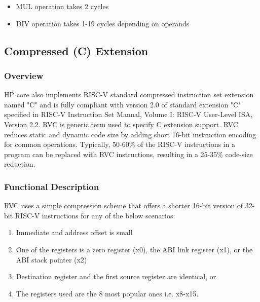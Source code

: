\documentclass[main\_\_EN.tex]{subfiles}
\begin{document}
\begin{itemize}
    \item MUL operation takes 2 cycles
    \item DIV operation takes 1-19 cycles depending on operands
\end{itemize}


\subsection{Compressed (C) Extension}
\label{sec:riscvcpu-cext}

\subsubsection{Overview}
\label{sec:riscvcpu-cext-overview}

HP core also implements RISC-V standard compressed instruction set extension named "C" and is fully compliant with version 2.0 of standard extension "C" specified in RISC-V Instruction Set Manual, Volume I: RISC-V User-Level ISA, Version 2.2. RVC is generic term used to specify C extension support. RVC reduces static and dynamic code size by adding short 16-bit instruction encoding for common operations. Typically, 50-60\% of the RISC-V instructions in a program can be replaced with RVC instructions, resulting in a 25-35\% code-size reduction.

\subsubsection{Functional Description}
\label{sec:riscvcpu-cext-func-descr}
RVC uses a simple compression scheme that offers a shorter 16-bit version of 32-bit RISC-V instructions for any of the below scenarios:
\begin{enumerate}
    \item Immediate and address offset is small
    \item One of the registers is a zero register (x0), the ABI link register (x1), or the ABI stack pointer (x2)
    \item Destination register and the first source register are identical, or
    \item The registers used are the 8 most popular ones i.e. x8-x15.
\end{enumerate}

\newpage

\end{document}
